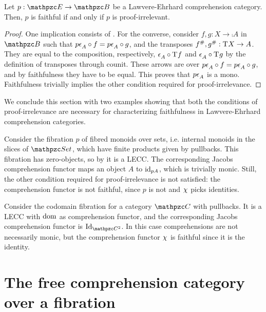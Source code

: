 \documentclass{lmcs} %
\theoremstyle{plain}\newtheorem{satz}[thm]{Satz} %
\begin{document}
			\begin{thm}\label{thm:faith-char}
Let $p : \ct{E}\to\ct{B}$ be a Lawvere-Ehrhard comprehension category. Then, $p$ is faithful if and only if $p$ is proof-irrelevant. 
			\end{thm}
			
			\begin{proof}
				One implication consists of . For the converse, consider $f,g:X\to \comp{}A$ in $\ct{B}$ such that $p\mathrm{\epsilon}^{}_A\circ f=p\mathrm{\epsilon}^{}_A\circ g$, and the transposes $f^{\#},g^{\#}:\mathrm{T}^{}X\to A$. They are equal to the composition, respectively, $\mathrm{\epsilon}^{}_A\circ \mathrm{T}^{}f$ and $\mathrm{\epsilon}^{}_A\circ\mathrm{T}^{}g$ by the definition of transposes through counit. These arrows are over $p\mathrm{\epsilon}^{}_A\circ f=p\mathrm{\epsilon}^{}_A\circ g$, and by faithfulness they have to be equal. This proves that $p\mathrm{\epsilon}^{}_A$ is a mono. Faithfulness trivially implies the other condition required for proof-irrelevance.
			\end{proof}

We conclude this section with two examples
showing that both the conditions of proof-irrelevance are necessary for characterizing faithfulness in Lawvere-Ehrhard comprehension categories. 

\begin{exa}
Consider the fibration $p$ of fibred monoids over sets, i.e. internal monoids in the slices of $\ctset$, which have finite products given by pullbacks.
This fibration has zero-objects, so by  it is a LECC. The corresponding Jacobs comprehension functor maps an object $A$ to $\mathrm{id}_{pA}$, which is trivially monic. Still, the other condition required for proof-irrelevance is not satisfied: the comprehension functor is not faithful, since $p$ is not and $\chi^{}$ picks identities.
\end{exa}

\begin{exa} 
Consider the codomain fibration for a category $\ct{C}$ with pullbacks. It is a LECC with $\mathop{\mathrm{dom}}\nolimits$ as comprehension functor, and the corresponding Jacobs comprehension functor is $\Id{\Arr{\ct{C}}}$. In this case comprehensions are not necessarily monic, but the comprehension functor $\chi^{}$ is faithful since it is the identity.
\end{exa}



			\section{The free comprehension category over a fibration}
			\label{sect:free-jcomp}
			
\end{document}
